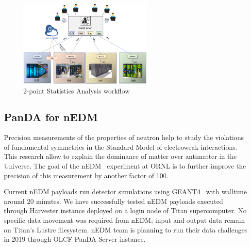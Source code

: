 \documentclass{webofc}
\begin{document}
\begin{figure}
	\centering
	\includegraphics[width=0.60\textwidth]{figures/LQCD_future_environment.png}
	\caption{2-point Statistics Analysis workflow}
	\label{fig:lqcd_env}
\end{figure}


\subsection{PanDA for nEDM} \label{section_nedm}

Precision measurements of the properties of neutron help to study the violations of fundamental symmetries in the Standard Model of electroweak interactions. 
This research allow to explain the dominance of matter over antimatter in the Universe. 
The goal of the nEDM~\cite{Lamoreaux_2009} experiment at ORNL is to further improve the precision of this measurement by another factor of 100.

Current nEDM payloads run detector simulations using GEANT4~\cite{AGOSTINELLI2003250} with walltime around 20 minutes. We have successfully tested nEDM payloads executed through Harvester instance deployed on a login node of Titan supercomputer. No specific data movement was required from nEDM; input and output data remain on Titan’s Lustre filesystem. nEDM team is planning to run their data challenges in 2019 through OLCF PanDA Server instance.


\end{document}
